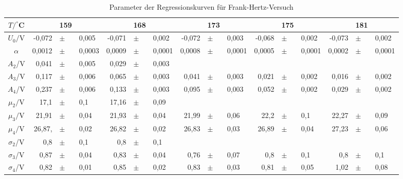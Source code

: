  \begin{table}[h]
    \centering
    \begin{tabular}{c | r p{0.05cm} l r p{0.05cm} l r p{0.05cm} l r p{0.05cm} l r p{0.05cm} l}
      \toprule
       $T/^\circ$C & & 159 & & & 168 & & & 173 & & & 175 & & & 181& \\  
      \midrule
      $U_0/$V &              -0,072         &$\pm$ & 0,005      &   -0,071        &$\pm$ & 0,002     & -0,072  & $\pm$ &  0,003  &  -0,068  & $\pm$  & 0,002 & -0,073 & $\pm$ & 0,002\\    
      $\alpha$& 0,0012         &$\pm$ & 0,0003    &  0,0009        &$\pm$ & 0,0001    & 0,0008  & $\pm$ & 0,0001   &   0,0005 & $\pm$  & 0,0001 & 0,0002 & $\pm$ & 0,0001\\
      $A_2$/V &              0,041         &$\pm$ & 0,005     &   0,029          &$\pm$ & 0,003    &   &  &   &    &   &  & & &\\ 
      $A_3$/V &              0,117         &$\pm$ & 0,006     &   0,065         &$\pm$ & 0,003    &  0,041 & $\pm$ & 0,003   &  0,021  & $\pm$  & 0,002 & 0,016 & $\pm$ & 0,002\\ 
      $A_4$/V &              0,237          &$\pm$ & 0,006     &   0,133          &$\pm$ & 0,003    & 0,095  & $\pm$ & 0,003   &  0,052  & $\pm$  & 0,002 & 0,029 & $\pm$ & 0,002\\ 
      $\mu_2/$V &            17,1          &$\pm$ & 0,1     &   17,16            &$\pm$ & 0,09     &   &  &    &   &   & & & &\\ 
      $\mu_3/$V &            21,91          &$\pm$ & 0,04     &   21,93          &$\pm$ & 0,04    &  21,99 & $\pm$ & 0,06   &  22,2  & $\pm$  & 0,1 & 22,27 & $\pm$ & 0,09\\ 
      $\mu_4/$V &            26,87,           &$\pm$ & 0,02      &   26,82           &$\pm$ & 0,02     & 26,83  & $\pm$ & 0,03   &   26,89 & $\pm$  & 0,04 & 27,23 & $\pm$ & 0,06\\ 
      $\sigma_2$/V &         0,8          &$\pm$ & 0,1      &   0,8          &$\pm$ & 0,1     &   &  &   &    &  &  &  & & \\ 
      $\sigma_3$/V &         0,87         &$\pm$ & 0,04     &   0,83          &$\pm$ & 0,04    & 0,76  & $\pm$ &  0,07  &  0,8  & $\pm$  & 0,1 & 0,8 & $\pm$ & 0,1\\ 
      $\sigma_4$/V &         0,82         &$\pm$ & 0,01      &   0,85         &$\pm$ & 0,02    & 0,83  & $\pm$ & 0,03   &   0,81 & $\pm$  & 0,05 & 1,02 & $\pm$ & 0,08\\ 
      \bottomrule
    \end{tabular}
    \caption{Parameter der Regressionskurven für Frank-Hertz-Versuch}
    \label{tab:fh_parameter_2}
  \end{table}

